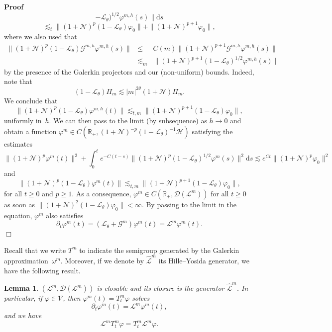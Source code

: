 \documentclass[10pt]{article}
\newcommand{\mathd}{\mathrm{d}}
\newenvironment{proof}{\noindent\textbf{Proof\ }}{\hspace*{\fill}$\Box$\medskip}
\newtheorem{lemma}{Lemma}
\begin{document}
\begin{proof}
\[     -\mathcal{L}_{\theta})^{1 / 2} \varphi^{m, h} (s) \| \mathd s \]
  \[ \lesssim_t \| (1 +\mathcal{N})^p (1 -\mathcal{L}_{\theta}) \varphi_0 \| +
     \| (1 +\mathcal{N})^{p + 1} \varphi_0 \|, \]
  where we also used that
  \begin{eqnarray*}
    \| (1 +\mathcal{N})^p (1 -\mathcal{L}_{\theta}) \mathcal{G}^{m, h}
    \varphi^{m, h} (s) \| & \leqslant & C (m) \| (1 +\mathcal{N})^{p + 1}
    \mathcal{G}^{m, h} \varphi^{m, h} (s) \|\\
    & \lesssim_m & \| (1 +\mathcal{N})^{p + 1} (1 -\mathcal{L}_{\theta})^{1 /
    2} \varphi^{m, h} (s) \|
  \end{eqnarray*}
  by the presence of the Galerkin projectors and our (non-uniform) bounds.
  Indeed, note that
  \[ (1 -\mathcal{L}_{\theta}) \Pi_m \lesssim | m |^{2 \theta} (1
     +\mathcal{N}) \Pi_m . \]
  We conclude that
  \[ \| (1 +\mathcal{N})^p (1 -\mathcal{L}_{\theta}) \varphi^{m, h} (t) \|
     \lesssim_{t, m} \| (1 +\mathcal{N})^{p + 1} (1 -\mathcal{L}_{\theta})
     \varphi_0 \|, \]
  uniformly in~$h$. We can then pass to the limit (by subsequence) as $h
  \rightarrow 0$ and obtain a function $\varphi^m \in C (\mathbb{R}_+, (1
  +\mathcal{N})^{- p} (1 -\mathcal{L}_{\theta})^{- 1} \mathcal{H})$ satisfying
  the estimates
  \[ \| (1 +\mathcal{N})^p \varphi^m (t) \|^2 + \int_0^t e^{- C (t - s)} \| (1
     +\mathcal{N})^p (1 -\mathcal{L}_{\theta})^{1 / 2} \varphi^m (s) \|^2
     \mathd s \lesssim e^{C t} \| (1 +\mathcal{N})^p \varphi_0 \|^2 \]
  and
  \[ \| (1 +\mathcal{N})^p (1 -\mathcal{L}_{\theta}) \varphi^m (t) \|
     \lesssim_{t, m} \| (1 +\mathcal{N})^{p + 1} (1 -\mathcal{L}_{\theta})
     \varphi_0 \|, \]
  for all $t \geqslant 0$ and $p \geqslant 1$. As a consequence, $\varphi^m
  \in C (\mathbb{R}_+, \mathcal{D} (\mathcal{L}^m))$ for all $t \geqslant 0$
  as soon as $\| (1 +\mathcal{N})^2 (1 -\mathcal{L}_{\theta}) \varphi_0 \| <
  \infty$. By passing to the limit in the equation, $\varphi^m$ also satisfies
  \[ \partial_t \varphi^m (t) = (\mathcal{L}_{\theta} +\mathcal{G}^m)
     \varphi^m (t) =\mathcal{L}^m \varphi^m (t) . \]
\end{proof}

Recall that we write $T^m$ to indicate the semigroup generated by the Galerkin
approximation~$\omega^m$. Moreover, if we denote by $\hat{\mathcal{L}}^m$ its
Hille--Yosida generator, we have the following result.

\begin{lemma}
  \label{eq:lemma-lm}$(\mathcal{L}^m, \mathcal{D} (\mathcal{L}^m))$ is
  closable and its closure is the generator $\hat{\mathcal{L}}^m$. In
  particular, if $\varphi \in \mathcal{V}$, then $\varphi^m (t) = T^m_t
  \varphi$ solves
  \[ \partial_t \varphi^m (t) =\mathcal{L}^m \varphi^m (t), \]
  and we have
  \[ \mathcal{L}^m T^m_t \varphi = T^m_t \mathcal{L}^m \varphi . \]
\end{lemma}
\end{document}
